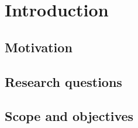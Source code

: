 \chapter{Introduction}

\section{Motivation}
\section{Research questions}
\section{Scope and objectives}